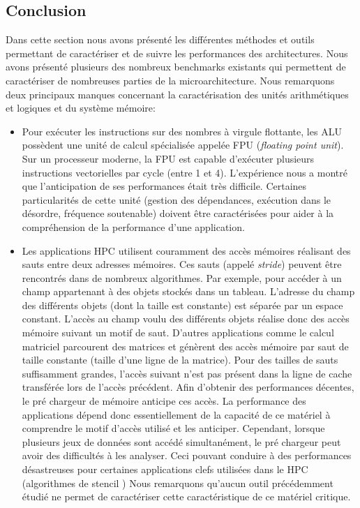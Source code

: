 \subsection{Conclusion} \label{sec:edl_hc_conclusion} \label{sec:edl_perf_conclusion}

    Dans cette section nous avons présenté les différentes méthodes et outils permettant de caractériser et de suivre les performances des architectures.  Nous avons présenté plusieurs des nombreux \glspl{benchmark} existants qui permettent de caractériser de nombreuses parties de la microarchitecture. Nous remarquons deux principaux manques concernant la caractérisation des unités arithmétiques et logiques et du système mémoire:
       \begin{itemize}
           \item Pour exécuter les instructions sur des nombres à virgule flottante, les ALU possèdent une unité de calcul spécialisée appelée FPU (\textit{floating point unit}). Sur un processeur moderne, la FPU est capable d'exécuter plusieurs instructions vectorielles par cycle (entre 1 et 4). L'expérience nous a montré que l'anticipation de ses performances était très difficile. Certaines particularités de cette unité (gestion des dépendances, exécution dans le désordre, fréquence soutenable) doivent être caractérisées pour aider à la compréhension de la performance d'une application. 
           
           \item Les applications \gls{HPC} utilisent couramment des accès mémoires réalisant des sauts entre deux adresses mémoires. Ces sauts (appelé \textit{stride}) peuvent être rencontrés dans de nombreux algorithmes. Par exemple, pour accéder à un champ appartenant à des objets stockés dans un tableau. L'adresse du champ des différents objets (dont la taille est constante) est séparée par un espace constant. L'accès au champ voulu des différents objets réalise donc des accès mémoire suivant un motif de saut. D’autres applications comme le calcul matriciel parcourent des matrices et génèrent des accès mémoire par saut de taille constante (taille d’une ligne de la matrice). Pour des tailles de sauts suffisamment grandes, l'accès suivant n'est pas présent dans la ligne de cache transférée lors de l'accès précédent. Afin d'obtenir des performances décentes, le pré chargeur de mémoire anticipe ces accès. La performance des applications dépend donc essentiellement de la capacité de ce matériel à comprendre le motif d'accès utilisé et les anticiper. Cependant, lorsque plusieurs jeux de données sont accédé simultanément, le pré chargeur peut avoir des difficultés à les analyser. Ceci pouvant conduire à des performances désastreuses pour certaines applications clefs utilisées dans le HPC (algorithmes de stencil \cite{datta2008stencil}) Nous remarquons qu'aucun outil précédemment étudié ne permet de caractériser cette caractéristique de ce matériel critique. 
       \end{itemize}
   
